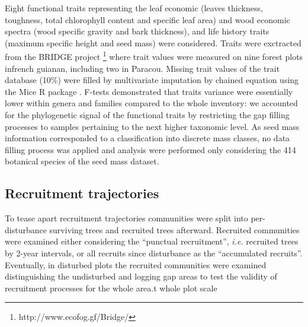 \documentclass[fleqn,10pt]{ArtEcoFoG} %
\begin{document}
Eight functional traits representing the leaf economic (leaves
thickness, toughness, total chlorophyll content and specific leaf area)
and wood economic spectra (wood specific gravity and bark thickness),
and life history traits (maximum specific height and seed mass) were
considered. Traits were exctracted from the BRIDGE project \footnote{http://www.ecofog.gf/Bridge/}
where trait values were measured on nine forest plots infrench guianan,
including two in Paracou. Missing trait values of the trait database
(10\%) were filled by multivariate imputation by chained equation using
the Mice R package \citep{Mice2011}. F-tests demonstrated that traits
variance were essentially lower within genera and families compared to
the whole inventory: we accounted for the phylogenetic signal of the
functional traits by restricting the gap filling processes to samples
pertaining to the next higher taxonomic level. As seed mass information
corresponded to a classification into discrete mass classes, no data
filling process was applied and analysis were performed only considering
the 414 botanical species of the seed mass dataset.

\subsection{Recruitment trajectories}\label{recruitment-trajectories}

To tease apart recruitment trajectories communities were split into
per-disturbance surviving trees and recruited trees afterward. Recruited
communities were examined either considering the ``punctual
recruitment'', \emph{i.e.} recruited trees by 2-year intervals, or all
recruits since disturbance as the ``accumulated recruits''. Eventually,
in disturbed plots the recruited communities were examined
distinguishing the undisturbed and logging gap areas to test the
validity of recruitment processes for the whole area.t whole plot scale
\end{document}
